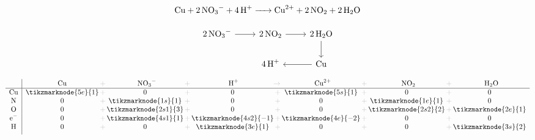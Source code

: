 \documentclass{ctexart}
\newcommand{\grayplus}{\,\color{lightgray}+\,}
\newcommand{\grayto}{\,\color{lightgray}\to\,}
\newcommand{\arrowLR}[3]{%
    \draw[->|,red,thick]
    ([xshift=2pt]#1.south east)
    .. controls ++(0.3cm,-0.2cm) and ++(-0.3cm,-0.2cm) ..
    ([xshift=-2pt]#2.south west)
    node[midway,below,blue,font=\small] {#3};
}
\newcommand{\arrowRL}[3]{%
    \draw[->|,red,thick]
    ([xshift=-2pt]#1.south west)
    .. controls ++(-0.3cm,-0.2cm) and ++(0.3cm,-0.2cm) ..
    ([xshift=2pt]#2.south east)
    node[midway,below,blue,font=\small] {#3};
}
\newcommand{\arrowsToOneLR}[4]{%
    \draw[->,red,thick]
    ([xshift=2pt]#1.south east)
    .. controls ++(0.3cm,-0.2cm) and ++(-0.3cm,-0.2cm) ..
    ([xshift=-2pt]#3.south west)
    node[midway,below,blue,font=\small] {#4};
    \draw[->,red,thick]
    (#2.south)
    .. controls ++(0.3cm,-0.2cm) and ++(-0.3cm,-0.2cm) ..
    ([xshift=-2pt]#3.south west);
}
\begin{document}
\begin{center}
    \noindent
    \begin{minipage}[c]{0.45\textwidth}
        \[
            \ce{Cu + 2NO3^- + 4H+ -> Cu^{2+} + 2NO2 + 2H2O}
        \]

        \[
            \begin{tikzcd}
                \ce{2NO3^-} \arrow[r] & \ce{2NO2} \arrow[r] &
                \ce{2H2O} \arrow[d] \\
                & \ce{4H^+} & \ce{Cu} \arrow[l]
            \end{tikzcd}
        \]
    \end{minipage}%
    \hspace{0.01\textwidth}
    \begin{minipage}[c]{0.45\textwidth}
        \[
            \begin{array}{c|*{5}{c@{\grayplus}}c}
                & \multicolumn{1}{c@{\grayplus}}{\ce{Cu}} &
                \multicolumn{1}{c@{\grayplus}}{\ce{NO3^-}} &
                \multicolumn{1}{c@{\grayto}}{\ce{H^+}} &
                \multicolumn{1}{c@{\grayplus}}{\ce{Cu^{2+}}} &
                \multicolumn{1}{c@{\grayplus}}{\ce{NO2}} &
                \multicolumn{1}{c}{\ce{H2O}} \\
                \hline
                \ce{Cu} & \tikzmarknode{5e}{1} & 0 & 0 &
                \tikzmarknode{5s}{1} & 0 & 0\\
                \ce{N} & 0 & \tikzmarknode{1s}{1} & 0 & 0
                &\tikzmarknode{1e}{1} & 0\\
                \ce{O} & 0 & \tikzmarknode{2s1}{3} & 0 & 0 &
                \tikzmarknode{2s2}{2} & \tikzmarknode{2e}{1}\\
                \ce{e-} & 0 & \tikzmarknode{4s1}{1} &
                \tikzmarknode{4s2}{-1} & \tikzmarknode{4e}{-2} & 0 & 0\\
                \ce{H} & 0 & 0 & \tikzmarknode{3e}{1} & 0 & 0 &
                \tikzmarknode{3s}{2}\\[1ex]
            \end{array}
        \]
    \end{minipage}
\end{center}

\printbibliography[heading=bibintoc,title={参考文献}]
\end{document}
